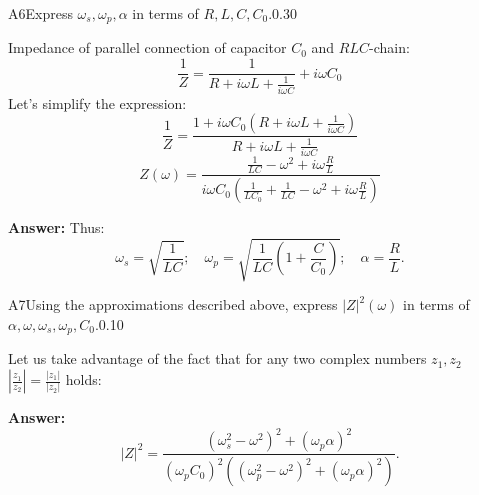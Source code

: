 \documentclass[11pt,a4paper]{article}
\begin{document}
\begin{solcard}{A6}{Express $\omega_s, \omega_p, \alpha$ in terms of $R, L, C, C_0$.}{0.30}

Impedance of parallel connection of capacitor $C_0$ and $RLC$-chain: \[\dfrac{1}{Z} = \dfrac{1}{R+i\omega L + \frac{1}{i\omega C}} + i\omega C_0 \] Let's simplify the expression: \[\dfrac{1}{Z} = \dfrac{1+i\omega C_0 \left(R+i\omega L + \frac{1}{i\omega C}\right)}{R+i\omega L + \frac{1}{i\omega C}}\]\[Z(\omega) = \dfrac{\frac{1}{LC}-\omega^2 + i\omega \frac{R}{L}}{i\omega C_0 \left(\frac{1}{LC_0}+\frac{1}{LC}-\omega^2 +i\omega\frac{R}{L}\right)}\]

\par\smallskip\noindent\textbf{Answer:} Thus: \[\omega_s = \sqrt{\dfrac{1}{LC}};\quad \omega_p = \sqrt{\dfrac{1}{LC}\left(1+\dfrac{C}{C_0}\right)}; \quad \alpha = \dfrac{R}{L}.\]
\end{solcard}

\begin{solcard}{A7}{Using the approximations described above, express $|Z|^2(\omega)$ in terms of $\alpha, \omega, \omega_s, \omega_p, C_0$.}{0.10}

Let us take advantage of the fact that for any two complex numbers $z_1, z_2$ $\left| \frac{z_1}{z_2}\right| = \frac{|z_1|}{|z_2|}$ holds:

\par\smallskip\noindent\textbf{Answer:} \[ |Z|^2 = \dfrac{(\omega_s^2 - \omega^2)^2 + (\omega_p \alpha)^2}{(\omega_p C_0)^2 ((\omega_p^2 - \omega^2)^2 + (\omega_p \alpha)^2)} .\]
\end{solcard}
\end{document}
